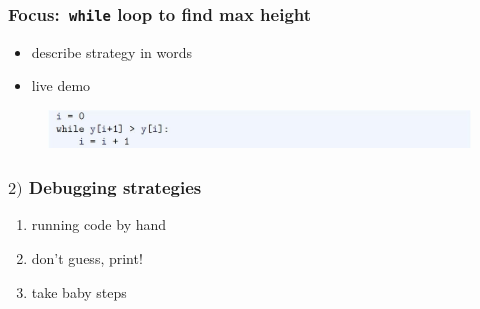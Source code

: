 \documentclass[14pt]{beamer}
\begin{document}

\begin{frame}[fragile]

\frametitle{Focus:~\texttt{while} loop to find max height}

\begin{itemize}
	\item describe strategy in words
	\item live demo
\end{itemize}


\begin{figure}[ht]
	\centering
	\includegraphics[width=\textwidth]{figures/LLp71d}
\end{figure}

\end{frame}


\begin{frame}[fragile]

\frametitle{$2)$ Debugging strategies}

\begin{enumerate}
	\item running code by hand
	\item don't guess, print!
	\item take baby steps
\end{enumerate}

\end{frame}

\end{document}

